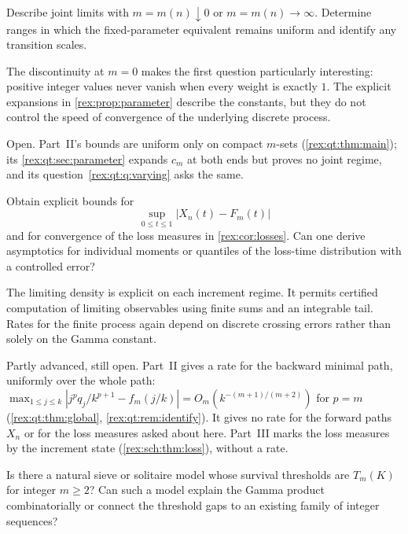 \begin{question}\label{rex:q:moving}
Describe joint limits with $m=m(n)\downarrow0$ or $m=m(n)\to\infty$.
Determine ranges in which the fixed-parameter equivalent remains
uniform and identify any transition scales.
\end{question}

The discontinuity at $m=0$ makes the first question particularly
interesting: positive integer values never vanish when every weight
is exactly $1$. The explicit expansions in
\cref{rex:prop:parameter} describe the constants, but they do not control
the speed of convergence of the underlying discrete process.

\begin{writenote}
Open. Part~II's bounds are uniform only on compact $m$-sets
(\cref{rex:qt:thm:main}); its \cref{rex:qt:sec:parameter} expands $c_m$ at
both ends but proves no joint regime, and its question~\ref{rex:qt:q:varying}
asks the same.
\end{writenote}

\begin{question}\label{rex:q:trajectory}
Obtain explicit bounds for
\[
 \sup_{0\leq t\leq1}|X_n(t)-F_m(t)|
\]
and for convergence of the loss measures in
\cref{rex:cor:losses}. Can one derive asymptotics for individual moments
or quantiles of the loss-time distribution with a controlled error?
\end{question}

The limiting density is explicit on each increment regime. It permits
certified computation of limiting observables using finite sums and
an integrable tail. Rates for the finite process again depend on
discrete crossing errors rather than solely on the Gamma constant.

\begin{writenote}
Partly advanced, still open. Part~II gives a rate for the backward minimal
path, uniformly over the whole path:
$\max_{1\le j\le k}|j^pq_j/k^{p+1}-f_m(j/k)|=O_m(k^{-(m+1)/(m+2)})$ for
$p=m$ (\cref{rex:qt:thm:global}, \cref{rex:qt:rem:identify}). It gives no
rate for the forward paths $X_n$ or for the loss measures asked about here.
Part~III marks the loss measures by the increment state
(\cref{rex:sch:thm:loss}), without a rate.
\end{writenote}

\begin{question}
Is there a natural sieve or solitaire model whose survival thresholds
are $T_m(K)$ for integer $m\geq2$? Can such a model explain the
Gamma product combinatorially or connect the threshold gaps to an
existing family of integer sequences?
\end{question}

